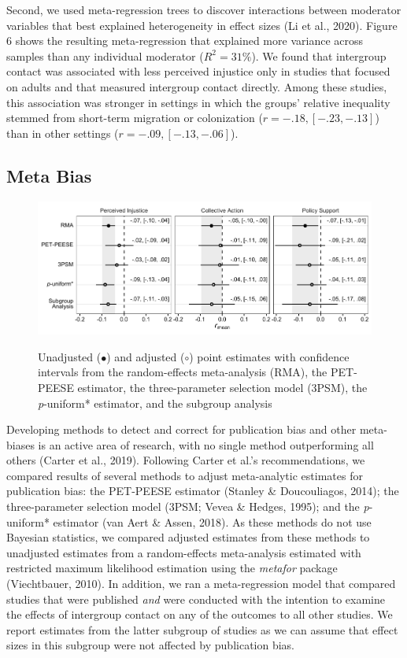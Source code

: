 \documentclass[12pt, letterpaper]{article}
\begin{document}
Second, we used meta-regression trees to discover interactions between
moderator variables that best explained heterogeneity in effect sizes
(Li et al., 2020). Figure 6 shows the resulting meta-regression that
explained more variance across samples than any individual moderator
(\(R^2 = 31\%\)). We found that intergroup contact was associated with
less perceived injustice only in studies that focused on adults and that
measured intergroup contact directly. Among these studies, this
association was stronger in settings in which the groups' relative
inequality stemmed from short-term migration or colonization
(\(r = -.18, [-.23, -.13]\)) than in other settings
(\(r = -.09, [-.13, -.06]\)).

\hypertarget{meta-bias}{%
\subsection{Meta Bias}\label{meta-bias}}

\begin{figure}
\centering
\caption{Unadjusted ($\bullet$) and adjusted ($\circ$) point estimates with confidence intervals from the random-effects meta-analysis (RMA), the PET-PEESE estimator, the three-parameter selection model (3PSM), the \textit{p}-uniform* estimator, and the subgroup analysis}
\includegraphics[scale=1]{../figures/figure-7}
\label{fig:f7}
\end{figure}

Developing methods to detect and correct for publication bias and other
meta-biases is an active area of research, with no single method
outperforming all others (Carter et al., 2019). Following Carter et
al.'s recommendations, we compared results of several methods to adjust
meta-analytic estimates for publication bias: the PET-PEESE estimator
(Stanley \& Doucouliagos, 2014); the three-parameter selection model
(3PSM; Vevea \& Hedges, 1995); and the \emph{p}-uniform* estimator (van
Aert \& Assen, 2018). As these methods do not use Bayesian statistics,
we compared adjusted estimates from these methods to unadjusted
estimates from a random-effects meta-analysis estimated with restricted
maximum likelihood estimation using the \emph{metafor} package
(Viechtbauer, 2010). In addition, we ran a meta-regression model that
compared studies that were published \emph{and} were conducted with the
intention to examine the effects of intergroup contact on any of the
outcomes to all other studies. We report estimates from the latter
subgroup of studies as we can assume that effect sizes in this subgroup
were not affected by publication bias.
\end{document}

